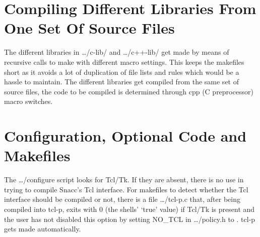 \section{Compiling Different Libraries From One Set Of Source Files}

The different libraries in {\ufn \dots/c-lib/} and {\ufn \dots/c++-lib/} get made by means of recursive calls to make with different macro settings.
This keeps the makefiles short as it avoids a lot of duplication of file lists and rules which would be a hassle to maintain.
The different libraries get compiled from the same set of source files, the code to be compiled is determined through {\ufn cpp} (C preprocessor) macro switches.

\section{Configuration, Optional Code and Makefiles}

The {\ufn \dots/configure} script looks for Tcl/Tk.
If they are absent, there is no use in trying to compile Snacc's Tcl interface.
For makefiles to detect whether the Tcl interface should be compiled or not, there is a file {\ufn \dots/tcl-p.c} that, after being compiled into {\ufn tcl-p}, exits with 0 (the shells' `true' value) if Tcl/Tk is present and the user has not disabled this option by setting {\C NO\_TCL} in {\ufn \dots/policy.h} to {}.
{\ufn tcl-p} gets made automatically.
